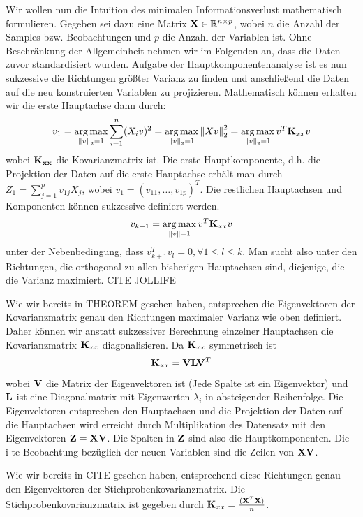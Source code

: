 Wir wollen nun die Intuition des minimalen Informationsverlust mathematisch formulieren. Gegeben sei dazu eine Matrix $\mathbf{X} \in \mathbb{R}^{n\times p}$, wobei $n$ die Anzahl der Samples bzw. Beobachtungen und $p$ die Anzahl der Variablen ist. Ohne Beschränkung der Allgemeinheit nehmen wir im Folgenden an, dass die Daten zuvor standardisiert wurden.
Aufgabe der Hauptkomponentenanalyse ist es nun sukzessive die Richtungen größter Varianz zu finden und anschließend die Daten auf die neu konstruierten Variablen zu projizieren. Mathematisch können erhalten wir die erste Hauptachse dann durch:
$$v_1 = \operatorname*{arg\,max}_{\left\lVert v \right\rVert_2 = 1} \sum_{i=1}^n(X_iv)^2 = \operatorname*{arg\,max}_{\left\lVert v \right\rVert_2 = 1} \left\lVert Xv \right\rVert_2^2 = \operatorname*{arg\,max}_{\left\lVert v \right\rVert_2 = 1} v^T \mathbf{K}_{xx} v$$
wobei $\mathbf{K_{xx}}$ die Kovarianzmatrix ist. Die erste Hauptkomponente, d.h. die Projektion der Daten auf die erste Hauptachse erhält man durch $Z_1 = \sum_{j=1}^{p} v_{1j}X_j$, wobei $v_1 = (v_{11}, \ldots, v_{1p})^T$. Die restlichen Hauptachsen und Komponenten können sukzessive definiert werden.
$$v_{k+1} = \operatorname*{arg\,max}_{\left\lVert v \right\rVert = 1} v^T \mathbf{K}_{xx} v$$ unter der Nebenbedingung, dass $v_{k+1}^Tv_l = 0, \forall 1 \leq l \leq k$. Man sucht also unter den Richtungen, die orthogonal zu allen bisherigen Hauptachsen sind, diejenige, die die Varianz maximiert.
\cite{zou_overview}
CITE JOLLIFE

Wie wir bereits in THEOREM gesehen haben, entsprechen die Eigenvektoren der Kovarianzmatrix genau den Richtungen maximaler Varianz wie oben definiert. Daher können wir anstatt sukzessiver Berechnung einzelner Hauptachsen die Kovarianzmatrix $\mathbf{K}_{xx}$ diagonalisieren. Da $\mathbf{K}_{xx}$ symmetrisch ist
$$\mathbf{K}_{xx} = \mathbf{V} \mathbf{L} \mathbf{V}^T$$
wobei $\mathbf{V}$ die Matrix der Eigenvektoren ist (Jede Spalte ist ein Eigenvektor) und $\mathbf{L}$ ist eine Diagonalmatrix mit Eigenwerten $\lambda_i$ in absteigender Reihenfolge. Die Eigenvektoren entsprechen den Hauptachsen und die Projektion der Daten auf die Hauptachsen wird erreicht durch Multiplikation des Datensatz mit den Eigenvektoren $\mathbf{Z} = \mathbf{X} \mathbf{V}$. Die Spalten in $\mathbf{Z}$ sind also die Hauptkomponenten. Die i-te Beobachtung bezüglich der neuen Variablen sind die Zeilen von $\mathbf{X}\mathbf{V}$.



 Wie wir bereits in CITE gesehen haben, entsprechend diese Richtungen genau den Eigenvektoren der Stichprobenkovarianzmatrix. Die Stichprobenkovarianzmatrix ist gegeben durch $\mathbf{K}_{xx} = \frac{(\mathbf{X}^T\mathbf{X})}{n}$. 
 



